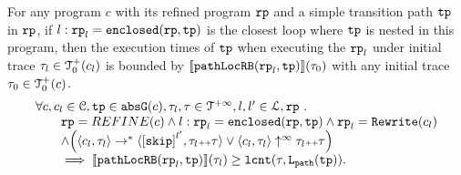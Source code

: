 \begin{lemma}
  For any program $c$ with its refined program $\mathtt{rp}$ and a simple transition path $\mathtt{tp}$ in $\mathtt{rp}$,
  if $l: \mathtt{rp}_l = \mathtt{enclosed}(\mathtt{rp}, \mathtt{tp})$ is the closest loop where $\mathtt{tp}$ is nested in this program,
  then the execution times of $\mathtt{tp}$ when executing the $\mathtt{rp}_l$ under initial trace $\mathtt{\tau}_l \in \mathcal{T}^{+}_0(c_l)$ is bounded by $\llbracket \mathtt{pathLocRB}(\mathtt{rp}_l, \mathtt{tp}) \rrbracket(\mathtt{\tau}_0)$ with any initial trace $\mathtt{\tau}_0 \in \mathcal{T}^{+}_0(c)$.
  \[
    \begin{array}{l}
    \forall c, c_l \in \cdom, \tpath \in \absG(c), 
    \trace_l, \trace \in \tdom, l, l' \in \ldom, \rprog \st 
    \\ \qquad
    \rprog = REFINE(c)
    \land
    l: \rprog_l = \kw{enclosed}(\rprog, \tpath)
    \land 
    \rprog_l = \algrewrite(c_l)
    \\ \qquad
    \land
    \Big(
    \config{c_l, \trace_l} \rightarrow^* \config{\clabel{\eskip}^{l'}, \trace_l \tracecat \trace}
    \lor \config{c_l, \trace_l} \uparrow^{\infty} \trace_l \tracecat \trace 
    \Big)
    \\ \qquad
    \implies
    \econfig{\outinB(\rprog_l, \tpath)}(\trace_l) \geq \lcounter(\trace, \pathl(\tpath)).
    \end{array}
  \]  
\end{lemma}
